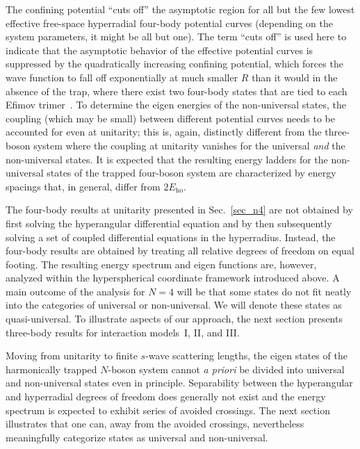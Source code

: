\documentclass[aps,pra,twocolumn,showpacs,superscriptaddress]{revtex4}
\begin{document}
The confining potential ``cuts off'' the asymptotic region
for all but the few 
lowest effective free-space hyperradial four-body
potential curves
(depending on the
system parameters, it might be all but one).
The term ``cuts off'' is used here to indicate that the asymptotic
behavior of the effective potential curves is suppressed by
the quadratically increasing confining potential, which forces the
wave function to fall off exponentially at much smaller $R$
than it would in the absence of the trap, where there
exist two four-body states that are tied to each Efimov 
trimer~\cite{vonstecher2009,platter2004}.
To determine the eigen energies of the non-universal states,
the coupling (which may be small)
between different potential curves
needs to be accounted for even at unitarity;
this is, again, distinctly different from the three-boson
system where the coupling at unitarity vanishes 
for the universal {\em{and}} the non-universal states.
It is expected that the resulting energy ladders 
for the non-universal states of the
trapped four-boson system 
are characterized by energy spacings that,
in general, differ from
$2 E_{\text{ho}}$.


The four-body results 
at unitarity presented in Sec.~\ref{sec_n4}
are not obtained by first solving the hyperangular differential
equation and by then subsequently solving a set of coupled differential 
equations in the hyperradius. Instead, the four-body results
are obtained by treating all relative
degrees of freedom on equal footing.
The resulting energy spectrum and eigen functions
are, however, analyzed within the
hyperspherical coordinate framework introduced above.
A main outcome of the analysis for
$N=4$ will be that some
states do not
fit neatly into the categories of universal or
non-universal. 
We will denote these states as quasi-universal.
To illustrate aspects of our approach, the next section
presents three-body results for interaction models~I, II, and III.

Moving from unitarity to finite $s$-wave scattering lengths,
the eigen states 
of the harmonically trapped $N$-boson system cannot
{\em{a priori}} be
divided into
universal and non-universal states even in principle.
Separability between the hyperangular and hyperradial degrees of freedom
does generally not exist and the energy spectrum is expected to exhibit
series of avoided crossings.
The next section illustrates that one can, away from the
avoided crossings, nevertheless meaningfully categorize states
as universal and non-universal.
\end{document}

